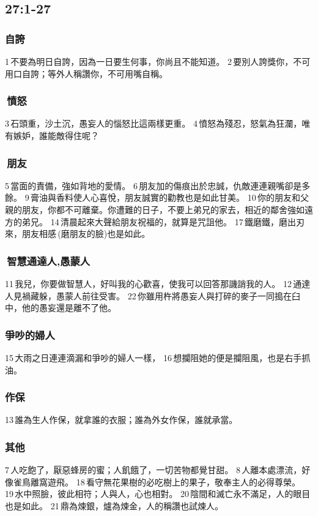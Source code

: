 \subsection{ 27:1-27}
\subsubsection{自誇}
1 不要為明日自誇，因為一日要生何事，你尚且不能知道。 
2 要別人誇獎你，不可用口自誇；等外人稱讚你，不可用嘴自稱。 

\subsubsection{ 憤怒}
3 石頭重，沙土沉，愚妄人的惱怒比這兩樣更重。 
4 憤怒為殘忍，怒氣為狂瀾，唯有嫉妒，誰能敵得住呢？ 

\subsubsection{ 朋友}
5 當面的責備，強如背地的愛情。 
6 朋友加的傷痕出於忠誠，仇敵連連親嘴卻是多餘。 
9 膏油與香料使人心喜悅，朋友誠實的勸教也是如此甘美。 
10 你的朋友和父親的朋友，你都不可離棄。你遭難的日子，不要上弟兄的家去，相近的鄰舍強如遠方的弟兄。 
14 清晨起來大聲給朋友祝福的，就算是咒詛他。
17 鐵磨鐵，磨出刃來，朋友相感 (磨朋友的臉)也是如此。 

\subsubsection{ 智慧通達人,愚蒙人}
11 我兒，你要做智慧人，好叫我的心歡喜，使我可以回答那譏誚我的人。 
12 通達人見禍藏躲，愚蒙人前往受害。
22 你雖用杵將愚妄人與打碎的麥子一同搗在臼中，他的愚妄還是離不了他。

\subsubsection{爭吵的婦人}
15 大雨之日連連滴漏和爭吵的婦人一樣， 16 想攔阻她的便是攔阻風，也是右手抓油。 

\subsubsection{作保}
13 誰為生人作保，就拿誰的衣服；誰為外女作保，誰就承當。 

\subsubsection{其他}
7 人吃飽了，厭惡蜂房的蜜；人飢餓了，一切苦物都覺甘甜。
8 人離本處漂流，好像雀鳥離窩遊飛。 
18 看守無花果樹的必吃樹上的果子，敬奉主人的必得尊榮。 
19 水中照臉，彼此相符；人與人，心也相對。 
20 陰間和滅亡永不滿足，人的眼目也是如此。 
21 鼎為煉銀，爐為煉金，人的稱讚也試煉人。
 
